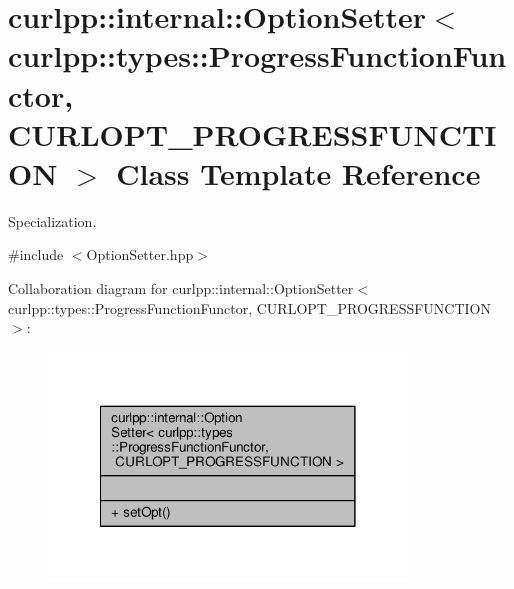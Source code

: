 \hypertarget{classcurlpp_1_1internal_1_1OptionSetter_3_01curlpp_1_1types_1_1ProgressFunctionFunctor_00_01CURLOPT__PROGRESSFUNCTION_01_4}{\section{curlpp\-:\-:internal\-:\-:Option\-Setter$<$ curlpp\-:\-:types\-:\-:Progress\-Function\-Functor, C\-U\-R\-L\-O\-P\-T\-\_\-\-P\-R\-O\-G\-R\-E\-S\-S\-F\-U\-N\-C\-T\-I\-O\-N $>$ Class Template Reference}
\label{classcurlpp_1_1internal_1_1OptionSetter_3_01curlpp_1_1types_1_1ProgressFunctionFunctor_00_01CURLOPT__PROGRESSFUNCTION_01_4}
}


Specialization.  




{\ttfamily \#include $<$Option\-Setter.\-hpp$>$}



Collaboration diagram for curlpp\-:\-:internal\-:\-:Option\-Setter$<$ curlpp\-:\-:types\-:\-:Progress\-Function\-Functor, C\-U\-R\-L\-O\-P\-T\-\_\-\-P\-R\-O\-G\-R\-E\-S\-S\-F\-U\-N\-C\-T\-I\-O\-N $>$\-:\nopagebreak
\begin{figure}[H]
\begin{center}
\leavevmode
\includegraphics[width=270pt]{classcurlpp_1_1internal_1_1OptionSetter_3_01curlpp_1_1types_1_1ProgressFunctionFunctor_00_01CURL7af8623290446774105a4dc739229c13}
\end{center}
\end{figure}
